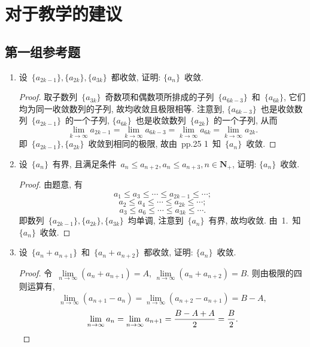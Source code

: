 \documentclass[UTF8,a4paper,11pt,twoside]{book}
\begin{document}
\section{对于教学的建议}
\subsection{第一组参考题}
\begin{enumerate}
	\item 设~$\{a_{2k-1}\}, \{a_{2k}\}, \{a_{3k}\}$~都收敛, 证明: $\{a_n\}$~收敛.
	      \begin{proof}
		      取子数列~$\{a_{3k}\}$~奇数项和偶数项所排成的子列~$\{a_{6k-3}\}$~和~$\{a_{6k}\}$, 它们均为同一收敛数列的子列, 故均收敛且极限相等. 注意到, $\{a_{6k-3}\}$~也是收敛数列~$\{a_{2k-1}\}$~的一个子列, $\{a_{6k}\}$~也是收敛数列~$\{a_{2k}\}$~的一个子列, 从而
		      \[
			      \lim\limits_{k\to\infty} a_{2k-1}=\lim\limits_{k\to\infty} a_{6k-3}=\lim\limits_{k\to\infty} a_{6k}=\lim\limits_{k\to\infty} a_{2k}.
		      \]
		      即~$\{a_{2k-1}\}, \{a_{2k}\}$~收敛到相同的极限, 故由~pp.25 1~知~$\{a_n\}$~收敛. \qedhere
	      \end{proof}

	\item 设~$\{a_n\}$~有界, 且满足条件~$a_n\leqslant a_{n+2}, a_n\leqslant a_{n+3}, n\in\mathbf{N}_{+}$, 证明: $\{a_n\}$~收敛.
	      \begin{proof}
		      由题意, 有
		      \[
			      a_1\leqslant a_3\leqslant\cdots\leqslant a_{2k-1}\leqslant\cdots;
		      \]
		      \[
			      a_2\leqslant a_4\leqslant\cdots\leqslant a_{2k}\leqslant\cdots;
		      \]
		      \[
			      a_3\leqslant a_6\leqslant\cdots\leqslant a_{3k}\leqslant\cdots.
		      \]
		      即数列~$\{a_{2k-1}\}, \{a_{2k}\}, \{a_{3k}\}$~均单调, 注意到~$\{a_n\}$~有界, 故均收敛. 由~1.~知~$\{a_n\}$~收敛.\qedhere
	      \end{proof}

	\item 设~$\{a_n+a_{n+1}\}$~和~$\{a_n+a_{n+2}\}$~都收敛, 证明: $\{a_n\}$~收敛.
	      \begin{proof}
		      令~$\lim\limits_{n\to\infty} (a_n+a_{n+1})=A$, $\lim\limits_{n\to\infty} (a_n+a_{n+2})=B$. 则由极限的四则运算有,
		      \[
			      \lim\limits_{n\to\infty} (a_{n+1}-a_{n})=\lim\limits_{n\to\infty} (a_{n+2}-a_{n+1})=B-A,
		      \]
		      \[
			      \lim\limits_{n\to\infty} a_n=\lim\limits_{n\to\infty} a_{n+1}=\dfrac{B-A+A}{2}=\dfrac{B}{2}.\qedhere
		      \]
	      \end{proof}


\end{enumerate}
\end{document}
